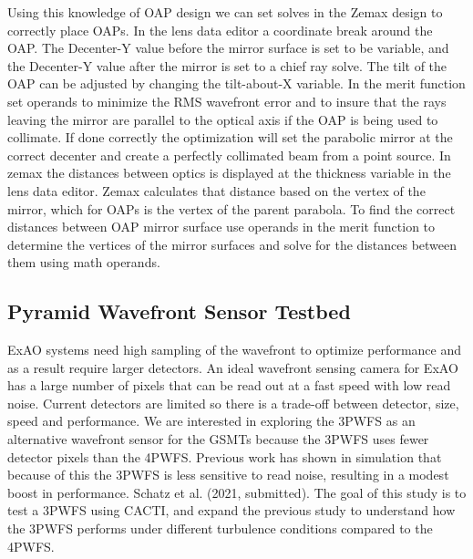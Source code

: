 Using this knowledge of OAP design we can set solves in the Zemax design to correctly place OAPs. In the lens data editor a coordinate break around the OAP. The Decenter-Y value before the mirror surface is set to be variable, and the Decenter-Y value after the mirror is set to a chief ray solve. The tilt of the OAP can be adjusted by changing the tilt-about-X variable.  In the merit function set operands to minimize the RMS wavefront error and to insure that the rays leaving the mirror are parallel to the optical axis if the OAP is being used to collimate. If done correctly the optimization will set the parabolic mirror at the correct decenter and create a perfectly collimated beam from a point source. In zemax the distances between optics is displayed at the thickness variable in the lens data editor. Zemax calculates that distance based on the vertex of the mirror, which for OAPs is the vertex of the parent parabola. To find the correct distances between OAP mirror surface use operands in the merit function to determine the vertices of the mirror surfaces and solve for the distances between them using math operands. 



\subsection{Pyramid Wavefront Sensor Testbed}

ExAO systems need high sampling of the wavefront to optimize performance and as a result require larger detectors. An ideal wavefront sensing camera for ExAO has a large number of pixels that can be read out at a fast speed with low read noise. Current detectors are limited so there is a trade-off between detector, size, speed and performance. We are interested in exploring the 3PWFS as an alternative wavefront sensor for the GSMTs because the 3PWFS uses fewer detector pixels than the 4PWFS. Previous work has shown in simulation that because of this the 3PWFS is less sensitive to read noise, resulting in a modest boost in performance. Schatz et al. (2021, submitted). The goal of this study is to test a 3PWFS using CACTI, and expand the previous study to understand how the 3PWFS performs under different turbulence conditions compared to the 4PWFS. 

